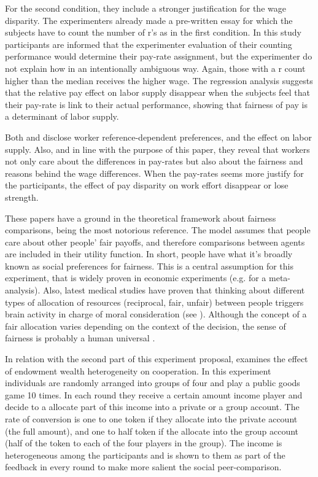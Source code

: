 \documentclass[a4paper, 12pt]{article}
\begin{document}
For the second condition, they include a stronger justification for the wage disparity. The experimenters already made a pre-written essay for which the subjects have to count the number of r’s as in the first condition. In this study participants are informed that the experimenter evaluation of their counting performance would determine their pay-rate assignment, but the experimenter do not explain how in an intentionally ambiguous way. Again, those with a r count higher than the median receives the higher wage. The regression analysis suggests that the relative pay effect on labor supply disappear when the subjects feel that their pay-rate is link to their actual performance, showing that fairness of pay is a determinant of labor supply.

Both \cite{Gachter2012} and \cite{Bracha2012} disclose worker reference-dependent preferences, and the effect on labor supply. Also, and in line with the purpose of this paper, they reveal that workers not only care about the differences in pay-rates but also about the fairness and reasons behind the wage differences. When the pay-rates seems more justify for the participants, the effect of pay disparity on work effort disappear or lose strength. 

These papers have a ground in the theoretical framework about fairness comparisons, being \cite{Fehr1999} the most notorious reference. The model assumes that people care about other people' fair payoffs, and therefore comparisons between agents are included in their utility function. In short, people have what it's broadly known as social preferences for fairness. This is a central assumption for this experiment, that is widely proven in economic experiments (e.g. \cite{ferguson2016} for a meta-analysis). Also, latest medical studies have proven that thinking about different types of allocation of resources (reciprocal, fair, unfair)  between people triggers brain activity in charge of moral consideration (see \citep{niemi2017sees, Niemi2017}). Although the concept of a fair allocation varies depending on the context of the decision, the sense of fairness is probably a human universal \citep{Henrich2001}. 

In relation with the second part of this experiment proposal, \cite{BUCKLEY2006} examines the effect of endowment wealth heterogeneity on cooperation. In this experiment individuals are randomly arranged into groups of four and play a public goods game 10 times. In each round they receive a certain amount income player and decide to a allocate part of this income into a private or a group account. The rate of conversion is one to one token if they allocate into the private account (the full amount), and one to half token if the allocate into the group account (half of the token to each of the four players in the group). The income is heterogeneous among the participants and is shown to them as part of the feedback in every round to make more salient the social peer-comparison. 
\end{document}
